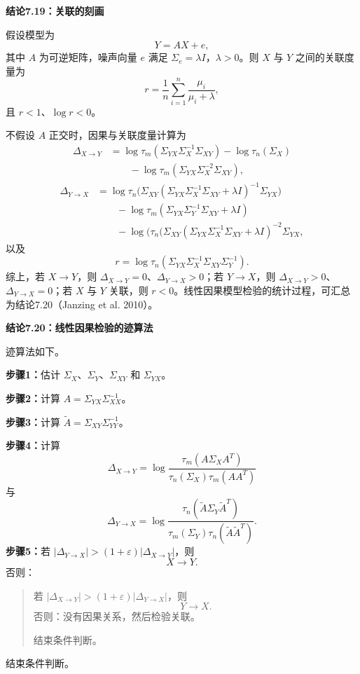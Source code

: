 \par\medskip{}\noindent\textbf{结论7.19：关联的刻画}\par
假设模型为
\[
Y=AX+e,
\]
其中 $A$ 为可逆矩阵，噪声向量 $e$ 满足 $\Sigma_e=\lambda I$，$\lambda>0$。则 $X$ 与 $Y$ 之间的关联度量为
\begin{equation}
r=\frac1n\sum_{i=1}^n\frac{\mu_i}{\mu_i+\lambda},
\tag{7.130}
\end{equation}
且 $r<1$、$\log r<0$。

不假设 $A$ 正交时，因果与关联度量计算为
\begin{equation}
\begin{aligned}
\Delta_{X\to Y}
&=\log\tau_m(\Sigma_{YX}\Sigma_X^{-1}\Sigma_{XY})-\log\tau_n(\Sigma_X)\\
&\hspace{2em}-\log\tau_m(\Sigma_{YX}\Sigma_X^{-2}\Sigma_{XY}),
\end{aligned}
\tag{7.131}
\end{equation}
\begin{equation}
\begin{aligned}
\Delta_{Y\to X}
&=\log\tau_n\bigl(\Sigma_{XY}(\Sigma_{YX}\Sigma_X^{-1}\Sigma_{XY}+\lambda I)^{-1}\Sigma_{YX}\bigr)\\
&\hspace{2em}-\log\tau_m(\Sigma_{YX}\Sigma_Y^{-1}\Sigma_{XY}+\lambda I)\\
&\hspace{2em}-\log(\tau_n(\Sigma_{XY}(\Sigma_{YX}\Sigma_X^{-1}\Sigma_{XY}+\lambda I)^{-2}\Sigma_{YX},
\end{aligned}
\tag{7.132}
\end{equation}
以及
\begin{equation}
r=\log\tau_n(\Sigma_{YX}\Sigma_X^{-1}\Sigma_{XY}\Sigma_Y^{-1}).
\tag{7.133}
\end{equation}
综上，若 $X\to Y$，则 $\Delta_{X\to Y}=0$、$\Delta_{Y\to X}>0$；若 $Y\to X$，则 $\Delta_{X\to Y}>0$、$\Delta_{Y\to X}=0$；若 $X$ 与 $Y$ 关联，则 $r<0$。线性因果模型检验的统计过程，可汇总为结论7.20（Janzing et al. 2010）。

\par\medskip{}\noindent\textbf{结论7.20：线性因果检验的迹算法}\par
迹算法如下。

\noindent\textbf{步骤1：}估计 $\Sigma_X$、$\Sigma_Y$、$\Sigma_{XY}$ 和 $\Sigma_{YX}$。

\noindent\textbf{步骤2：}计算 $A=\Sigma_{YX}\Sigma_{XX}^{-1}$。

\noindent\textbf{步骤3：}计算 $\widetilde A=\Sigma_{XY}\Sigma_{YY}^{-1}$。

\noindent\textbf{步骤4：}计算
\[
\Delta_{X\to Y}=\log\frac{\tau_m(A\Sigma_XA^T)}{\tau_n(\Sigma_X)\tau_m(AA^T)}
\]
与
\[
\Delta_{Y\to X}=\log\frac{\tau_n(\widetilde A\Sigma_Y\widetilde A^T)}
{\tau_m(\Sigma_Y)\tau_n(\widetilde A\widetilde A^T)}.
\]
\noindent\textbf{步骤5：}若 $|\Delta_{Y\to X}|>(1+\varepsilon)|\Delta_{X\to Y}|$，则
\[
X\to Y.
\]
否则：
\begin{quote}
若 $|\Delta_{X\to Y}|>(1+\varepsilon)|\Delta_{Y\to X}|$，则
\[
Y\to X.
\]
否则：没有因果关系，然后检验关联。

结束条件判断。
\end{quote}
结束条件判断。
